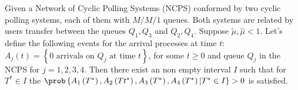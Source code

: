\begin{Teo}\label{First.Regeneration.Time.Theorem}
Given a Network of Cyclic Polling Systems (NCPS) conformed by two cyclic polling systems, each of them with $M/M/1$ queues. Both systems are related by users transfer between the queues $Q_{1},Q_{3}$ and $Q_{2},Q_{4}$. Suppose $\tilde{\mu},\hat{\mu}<1$. Let's define the following events for the arrival processes at time $t$: $A_{j}\left(t\right)=\left\{0 \textrm{ arrivals on }Q_{j}\textrm{ at time }t\right\}$, for some $t\geq0$ and queue $Q_{j}$ in the NCPS for $j=1,2,3,4$. Then there exist an non empty interval $I$ such that for $T^{*}\in I$ the $\prob\left\{A_{1}\left(T^{*}\right),A_{2}\left(Tt^{*}\right),
A_{3}\left(T^{*}\right),A_{4}\left(T^{*}\right)|T^{*}\in I\right\}>0$ is satisfied.

\end{Teo}
